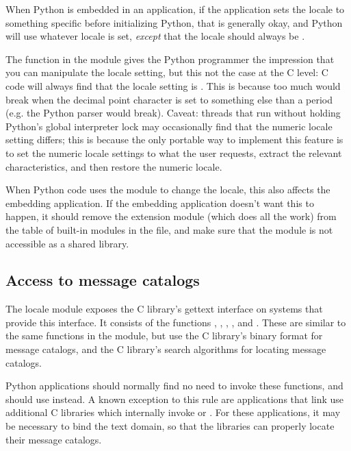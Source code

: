 When Python is embedded in an application, if the application sets the
locale to something specific before initializing Python, that is
generally okay, and Python will use whatever locale is set,
\emph{except} that the  locale should always be
.

The  function in the  module
gives the Python programmer the impression that you can manipulate the
 locale setting, but this not the case at the C
level: C code will always find that the  locale
setting is .  This is because too much would break when the
decimal point character is set to something else than a period
(e.g. the Python parser would break).  Caveat: threads that run
without holding Python's global interpreter lock may occasionally find
that the numeric locale setting differs; this is because the only
portable way to implement this feature is to set the numeric locale
settings to what the user requests, extract the relevant
characteristics, and then restore the  numeric locale.

When Python code uses the  module to change the locale,
this also affects the embedding application.  If the embedding
application doesn't want this to happen, it should remove the
 extension module (which does all the work) from the
table of built-in modules in the  file, and make sure
that the  module is not accessible as a shared library.


\subsection{Access to message catalogs \label{locale-gettext}}

The locale module exposes the C library's gettext interface on systems
that provide this interface.  It consists of the functions
, , ,
, and .  These are
similar to the same functions in the  module, but use
the C library's binary format for message catalogs, and the C
library's search algorithms for locating message catalogs. 

Python applications should normally find no need to invoke these
functions, and should use  instead.  A known
exception to this rule are applications that link use additional C
libraries which internally invoke  or
.  For these applications, it may be necessary to
bind the text domain, so that the libraries can properly locate their
message catalogs.
